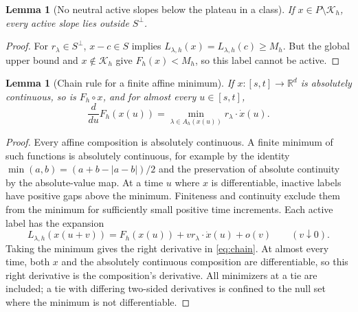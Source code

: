 \documentclass[11pt]{article}
\newtheorem{lemma}[theorem]{Lemma}
\theoremstyle{definition}
\theoremstyle{remark}
\newcommand{\R}{\mathbb R}
\numberwithin{equation}{section}
\begin{document}
\begin{lemma}[No neutral active slopes below the plateau in a class]
\label{lem:neutral}
If $x\in P\setminus\mathcal K_h$, every active slope lies outside
$S^\perp$.
\end{lemma}
\begin{proof}
For $r_\lambda\in S^\perp$, $x-c\in S$ implies
$L_{\lambda,h}(x)=L_{\lambda,h}(c)\geq M_h$.
But the global upper bound and $x\notin\mathcal K_h$ give
$F_h(x)<M_h$, so this label cannot be active.
\end{proof}

\begin{lemma}[Chain rule for a finite affine minimum]
\label{lem:chain}
If $x:[s,t]\to\R^d$ is absolutely continuous, so is
$F_h\circ x$, and for almost every $u\in[s,t]$,
\begin{equation}
 \frac{d}{du}F_h(x(u))
     =\min_{\lambda\in A_h(x(u))}r_\lambda\cdot\dot x(u).
 \label{eq:chain}
\end{equation}
\end{lemma}
\begin{proof}
Every affine composition is absolutely continuous. A finite
minimum of such functions is absolutely continuous, for example
by the identity $\min(a,b)=(a+b-|a-b|)/2$ and the preservation
of absolute continuity by the absolute-value map.
At a time $u$ where $x$ is differentiable, inactive labels have
positive gaps above the minimum. Finiteness and continuity
exclude them from the minimum for sufficiently small positive
time increments. Each active label has the expansion
\[
 L_{\lambda,h}(x(u+v))
   =F_h(x(u))+v r_\lambda\cdot\dot x(u)+o(v)
       \qquad(v\downarrow0).
\]
Taking the minimum gives the right derivative in
\eqref{eq:chain}. At almost every time, both $x$ and the
absolutely continuous composition are differentiable, so this
right derivative is the composition's derivative. All
minimizers at a tie are included; a tie with differing two-sided
derivatives is confined to the null set where the minimum is
not differentiable.
\end{proof}
\end{document}
